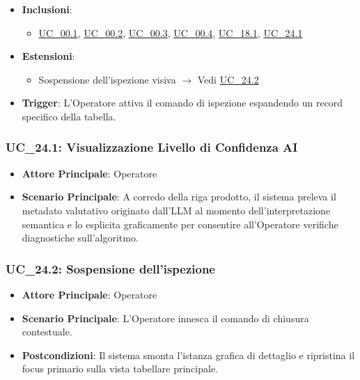 \begin{itemize}
    \begin{itemize}
        \item Il sistema espone il dettaglio completo dell'ordine e il log conversazionale in modalità puramente consultiva, garantendo l'assoluta immutabilità dello storico. Si ribadisce l'assenza di dati legati al pricing, delegati all'ERP esterno.
    \end{itemize}
    \item \textbf{Inclusioni}:
    \begin{itemize}
        \item \hyperref[uc_00.1]{UC\_00.1}, \hyperref[uc_00.2]{UC\_00.2}, \hyperref[uc_00.3]{UC\_00.3}, \hyperref[uc_00.4]{UC\_00.4}, \hyperref[uc_18.1]{UC\_18.1}, \hyperref[uc_24.1]{UC\_24.1}
    \end{itemize}
    \item \textbf{Estensioni}:
    \begin{itemize}
        \item Sospensione dell'ispezione visiva $\rightarrow$ Vedi \hyperref[uc_24.2]{UC\_24.2}
    \end{itemize}
    \item \textbf{Trigger}: L'Operatore attiva il comando di ispezione espandendo un record specifico della tabella.
\end{itemize}

\subsubsection{UC\_24.1: Visualizzazione Livello di Confidenza AI}
\label{uc_24.1}
\begin{itemize}
    \item \textbf{Attore Principale}: Operatore
    \item \textbf{Scenario Principale}: A corredo della riga prodotto, il sistema preleva il metadato valutativo originato dall'LLM al momento dell'interpretazione semantica e lo esplicita graficamente per consentire all'Operatore verifiche diagnostiche sull'algoritmo.
\end{itemize}

\subsubsection{UC\_24.2: Sospensione dell'ispezione}
\label{uc_24.2}
\begin{itemize}
    \item \textbf{Attore Principale}: Operatore
    \item \textbf{Scenario Principale}: L'Operatore innesca il comando di chiusura contestuale.
    \item \textbf{Postcondizioni}: Il sistema smonta l'istanza grafica di dettaglio e ripristina il focus primario sulla vista tabellare principale.
\end{itemize}

